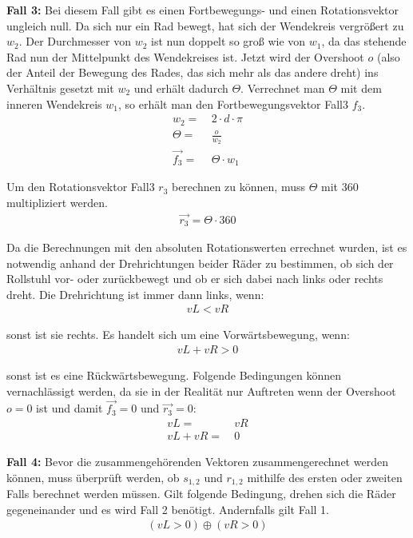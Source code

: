 \textbf{Fall 3:}
Bei diesem Fall gibt es einen Fortbewegungs- und einen Rotationsvektor ungleich null.
Da sich nur ein Rad bewegt, hat sich der Wendekreis vergrößert zu $w_2$.
Der Durchmesser von $w_2$ ist nun doppelt so groß wie von $w_1$, da das stehende Rad nun der Mittelpunkt des Wendekreises ist.
Jetzt wird der Overshoot $o$ (also der Anteil der Bewegung des Rades, das sich mehr als das andere dreht) ins Verhältnis gesetzt mit $w_2$ und erhält dadurch $\Theta$.
Verrechnet man $\Theta$ mit dem inneren Wendekreis $w_1$, so erhält man den Fortbewegungsvektor Fall3 $f_3$.
\begin{align}
    w_2 =       & \ 2 \cdot d \cdot \pi \\
    \Theta =    & \ \frac {o} {w_2}     \\
    \vec{f_3} = & \ \Theta \cdot w_1
\end{align}

Um den Rotationsvektor Fall3 $r_3$ berechnen zu können, muss $\Theta$ mit $360$ multipliziert werden.
\begin{align}
    \vec{r_3} = \Theta \cdot 360
\end{align}

Da die Berechnungen mit den absoluten Rotationswerten errechnet wurden, ist es notwendig anhand der Drehrichtungen beider Räder zu bestimmen, ob sich der Rollstuhl vor- oder zurückbewegt und ob er sich dabei nach links oder rechts dreht.
Die Drehrichtung ist immer dann links, wenn:
\begin{align}
    vL < vR
\end{align}

sonst ist sie rechts.
Es handelt sich um eine Vorwärtsbewegung, wenn:
\begin{align}
    vL + vR > 0
\end{align}

sonst ist es eine Rückwärtsbewegung.
Folgende Bedingungen können vernachlässigt werden, da sie in der Realität nur Auftreten wenn der Overshoot $o = 0$ ist und damit $\vec{f_3} = 0$ und $\vec{r_3} = 0$:
\begin{align}
    vL =      & \ vR \\
    vL + vR = & \ 0
\end{align}

\textbf{Fall 4:}
Bevor die zusammengehörenden Vektoren zusammengerechnet werden können, muss überprüft werden, ob $s_{1,2}$ und $r_{1,2}$ mithilfe des ersten oder zweiten Falls berechnet werden müssen.
Gilt folgende Bedingung, drehen sich die Räder gegeneinander und es wird Fall 2 benötigt.
Andernfalls gilt Fall 1.
\begin{align}
    (vL > 0) \oplus (vR > 0)
\end{align}


